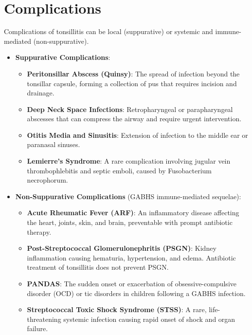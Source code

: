 \section*{Complications}
Complications of tonsillitis can be local (suppurative) or systemic and immune-mediated (non-suppurative).
\begin{itemize}
    \item \textbf{Suppurative Complications}:
    \begin{itemize}
        \item \textbf{Peritonsillar Abscess (Quinsy)}: The spread of infection beyond the tonsillar capsule, forming a collection of pus that requires incision and drainage.
        \item \textbf{Deep Neck Space Infections}: Retropharyngeal or parapharyngeal abscesses that can compress the airway and require urgent intervention.
        \item \textbf{Otitis Media and Sinusitis}: Extension of infection to the middle ear or paranasal sinuses.
        \item \textbf{Lemierre's Syndrome}: A rare complication involving jugular vein thrombophlebitis and septic emboli, caused by Fusobacterium necrophorum.
    \end{itemize}
    \item \textbf{Non-Suppurative Complications} (GABHS immune-mediated sequelae):
    \begin{itemize}
        \item \textbf{Acute Rheumatic Fever (ARF)}: An inflammatory disease affecting the heart, joints, skin, and brain, preventable with prompt antibiotic therapy.
        \item \textbf{Post-Streptococcal Glomerulonephritis (PSGN)}: Kidney inflammation causing hematuria, hypertension, and edema. Antibiotic treatment of tonsillitis does not prevent PSGN.
        \item \textbf{PANDAS}: The sudden onset or exacerbation of obsessive-compulsive disorder (OCD) or tic disorders in children following a GABHS infection.
        \item \textbf{Streptococcal Toxic Shock Syndrome (STSS)}: A rare, life-threatening systemic infection causing rapid onset of shock and organ failure.
    \end{itemize}
\end{itemize}

